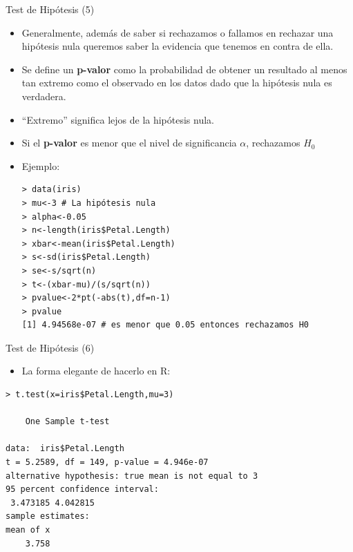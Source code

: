 \documentclass[handout]{beamer}
\begin{document}
\begin{frame}[fragile]{Test de Hipótesis (5)}
\scriptsize{
\begin{itemize}
 \item Generalmente, además de saber si rechazamos o fallamos en rechazar una hipótesis nula queremos saber la evidencia que tenemos en contra de ella.
 \item Se define un \textbf{p-valor} como la probabilidad de obtener un resultado al menos tan extremo como el observado en los datos dado que la hipótesis nula es verdadera.
 \item ``Extremo'' significa lejos de la hipótesis nula.
 \item Si el \textbf{p-valor} es menor que el nivel de significancia $\alpha$, rechazamos $H_{0}$ 
 \item Ejemplo:
\begin{verbatim}
> data(iris)
> mu<-3 # La hipótesis nula
> alpha<-0.05
> n<-length(iris$Petal.Length)
> xbar<-mean(iris$Petal.Length)
> s<-sd(iris$Petal.Length)
> se<-s/sqrt(n)
> t<-(xbar-mu)/(s/sqrt(n))
> pvalue<-2*pt(-abs(t),df=n-1)
> pvalue
[1] 4.94568e-07 # es menor que 0.05 entonces rechazamos H0
\end{verbatim}
\end{itemize}

 


}
\end{frame}

\begin{frame}[fragile]{Test de Hipótesis (6)}
\scriptsize{
\begin{itemize}
 \item La forma elegante de hacerlo en R:
\end{itemize}

\begin{verbatim}
> t.test(x=iris$Petal.Length,mu=3)

	One Sample t-test

data:  iris$Petal.Length 
t = 5.2589, df = 149, p-value = 4.946e-07
alternative hypothesis: true mean is not equal to 3 
95 percent confidence interval:
 3.473185 4.042815 
sample estimates:
mean of x 
    3.758 
\end{verbatim}
}



\end{frame}
\end{document}
